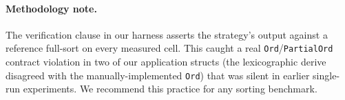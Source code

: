 \paragraph{Methodology note.}
The verification clause in our harness asserts the strategy's output against
a reference full-sort on every measured cell. This caught a real
\texttt{Ord}/\texttt{PartialOrd} contract violation in two of our application
structs (the lexicographic derive disagreed with the manually-implemented
\texttt{Ord}) that was silent in earlier single-run experiments. We
recommend this practice for any sorting benchmark.
